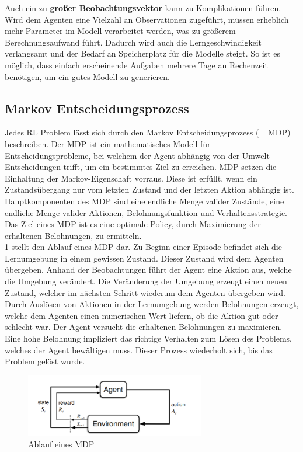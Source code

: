Auch ein zu \textbf{großer Beobachtungsvektor} kann zu Komplikationen führen. Wird dem Agenten eine Vielzahl an Observationen zugeführt, müssen erheblich mehr Parameter im Modell verarbeitet werden, was zu größerem Berechnungsaufwand führt. Dadurch wird auch die Lerngeschwindigkeit verlangsamt und der Bedarf an Speicherplatz für die Modelle steigt. So ist es möglich, dass einfach erscheinende Aufgaben mehrere Tage an Rechenzeit benötigen, um ein gutes Modell zu generieren.
\cite{zai_einstieg_2020}

\newpage
\subsection{Markov Entscheidungsprozess}
Jedes RL Problem lässt sich durch den Markov Entscheidungsprozess (= MDP) beschreiben.
Der MDP ist ein mathematisches Modell für Entscheidungsprobleme, bei welchem der Agent abhängig von der Umwelt Entscheidungen trifft, um ein bestimmtes Ziel zu erreichen.
MDP setzen die Einhaltung der Markov-Eigenschaft vorraus. Diese ist erfüllt, wenn ein Zustandsübergang nur vom letzten Zustand und der letzten Aktion abhängig ist.
Hauptkomponenten des MDP sind eine endliche Menge valider Zustände, eine endliche Menge valider Aktionen, Belohnungsfunktion und Verhaltensstrategie.
Das Ziel eines MDP ist es eine optimale Policy, durch Maximierung der erhaltenen Belohnungen, zu ermitteln. \\
\ref{fig:markov} stellt den Ablauf eines MDP dar. Zu Beginn einer Episode befindet sich die Lernumgebung in einem gewissen Zustand. Dieser Zustand wird dem Agenten übergeben. Anhand der Beobachtungen führt der Agent eine Aktion aus, welche die Umgebung verändert. Die Veränderung der Umgebung erzeugt einen neuen Zustand, welcher im nächsten Schritt wiederum dem Agenten übergeben wird. Durch Auslösen von Aktionen in der Lernumgebung werden Belohnungen erzeugt, welche dem Agenten einen numerischen Wert liefern, ob die Aktion gut oder schlecht war. Der Agent versucht die erhaltenen Belohnungen zu maximieren.
Eine hohe Belohnung impliziert das richtige Verhalten zum Lösen des Problems, welches der Agent bewältigen muss.
Dieser Prozess wiederholt sich, bis das Problem gelöst wurde. \cite{zai_einstieg_2020}

\begin{figure}[!h]
	\centering
	\includegraphics[width=0.7\textwidth]{Bilder/Markov.png}
	\caption{Ablauf eines MDP \cite{sutton_reinforcement_2014}}
	\label{fig:markov}
\end{figure}

